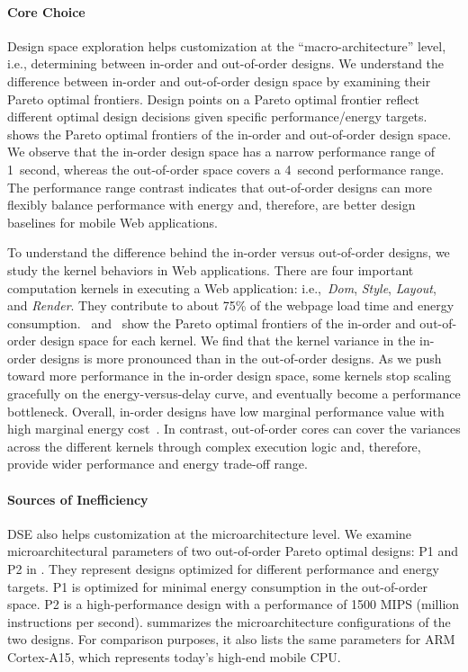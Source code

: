 \paragraph{Core Choice} Design space exploration helps customization at the ``macro-architecture'' level, i.e., determining between in-order and out-of-order designs. We understand the difference between in-order and out-of-order design space by examining their Pareto optimal frontiers. Design points on a Pareto optimal frontier reflect different optimal design decisions given specific performance/energy targets.  shows the Pareto optimal frontiers of the in-order and out-of-order design space. We observe that the in-order design space has a narrow performance range of 1~second, whereas the out-of-order space covers a 4~second performance range. The performance range contrast indicates that out-of-order designs can more flexibly balance performance with energy and, therefore, are better design baselines for mobile Web applications.

To understand the difference behind the in-order versus out-of-order designs, we study the kernel behaviors in Web applications. There are four important computation kernels in executing a Web application: i.e.,~\textit{Dom}, \textit{Style}, \textit{Layout}, and \textit{Render}. They contribute to about 75\% of the webpage load time and energy consumption.~ and~ show the Pareto optimal frontiers of the in-order and out-of-order design space for each kernel. We find that the kernel variance in the in-order designs is more pronounced than in the out-of-order designs. As we push toward more performance in the in-order design space, some kernels stop scaling gracefully on the energy-versus-delay curve, and eventually become a performance bottleneck. Overall, in-order designs have low marginal performance value with high marginal energy cost~\cite{marginal}. In contrast, out-of-order cores can cover the variances across the different kernels through complex execution logic and, therefore, provide wider performance and energy trade-off range.

\paragraph{Sources of Inefficiency} DSE also helps customization at the microarchitecture level. We examine microarchitectural parameters of two out-of-order Pareto optimal designs: P1 and P2 in . They represent designs optimized for different performance and energy targets. P1 is optimized for minimal energy consumption in the out-of-order space. P2 is a high-performance design with a performance of 1500 MIPS (million instructions per second).  summarizes the microarchitecture configurations of the two designs. For comparison purposes, it also lists the same parameters for ARM Cortex-A15, which represents today's high-end mobile CPU.

